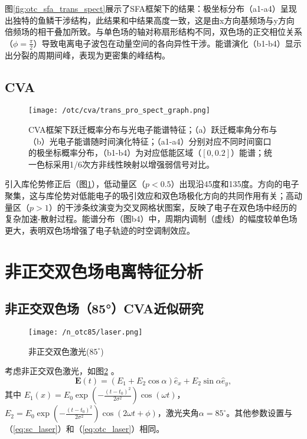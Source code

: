 图\ref{fig:otc_sfa_trans_spect}展示了SFA框架下的结果：极坐标分布（a1-a4）呈现出独特的鱼鳞干涉结构，此结果和中结果高度一致，这是由x方向基频场与y方向倍频场的相干叠加所致。与单色场的轴对称扇形结构不同，双色场的正交相位关系（$\phi = \frac{\pi}{2}$）导致电离电子波包在动量空间的各向异性干涉。能谱演化（b1-b4）显示出分裂的周期间峰，表现为更密集的峰结构。

\subsection{CVA}

\begin{figure}[!htbp]  %
	\centering
	\texttt{[image: /otc/cva/trans\_pro\_spect\_graph.png]}
	\caption{CVA框架下跃迁概率分布与光电子能谱特征；（a）跃迁概率角分布与（b）光电子能谱随时间演化特征；（a1-a4）分别对应不同时间窗口的极坐标概率分布，（b1-b4）为对应低能区域（$[0, 0.2]$）能谱；统一色标采用1/6次方非线性映射以增强弱信号对比。}
	\label{fig:otc_cva_trans_spect}
\end{figure}

引入库伦势修正后（图\ref{fig:otc_cva_trans_spect}），低动量区（$p<0.5$）出现沿45度和135度。方向的电子聚集，这与库伦势对低能电子的吸引效应和双色场极化方向的共同作用有关；高动量区（$p>1$）的干涉条纹演变为交叉网格状图案，反映了电子在双色场中经历的复杂加速-散射过程。能谱分布（图b4）中，周期内调制（虚线）的幅度较单色场更大，表明双色场增强了电子轨迹的时空调制效应。

%
\section{非正交双色场电离特征分析}
\subsection{非正交双色场（85°）CVA近似研究}

\begin{figure}[!htbp]  %
	\centering
	\texttt{[image: /n\_otc85/laser.png]}
	\caption{非正交双色激光($85^\circ$)}
	\label{fig:n_otc85_laser}
\end{figure}

考虑非正交双色激光，如图\ref{fig:n_otc85_laser} 。
\begin{equation}
	\mathbf{E}(t) = \left(E_1 + E_2\cos\alpha\right) \hat e_x + E_2\sin\alpha \hat e_y,
\end{equation}
其中 $E_1(x) = E_0 \exp\left(-\frac{(t - t_0)^2}{2\sigma^2}\right) \cos(\omega t)$，$E_2 = E_0 \exp\left(-\frac{(t - t_0)^2}{2\sigma^2}\right) \cos(2 \omega t + \phi)$，激光夹角$\alpha = 85^\circ$。其他参数设置与（\ref{eq:sc_laser}）和（\ref{eq:otc_laser}）相同。


